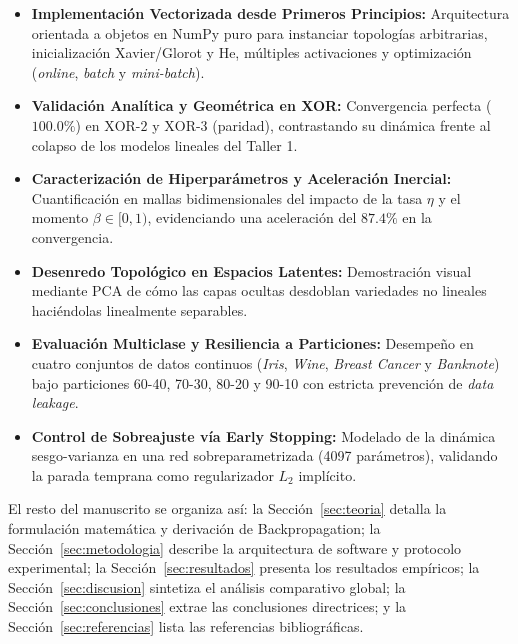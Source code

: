 \documentclass{article}
\begin{document}
\begin{takeawaybox}
\begin{itemize}
    \item \textbf{Implementación Vectorizada desde Primeros Principios:} Arquitectura orientada a objetos en NumPy puro para instanciar topologías arbitrarias, inicialización Xavier/Glorot y He, múltiples activaciones y optimización (\textit{online}, \textit{batch} y \textit{mini-batch}).
    \item \textbf{Validación Analítica y Geométrica en XOR:} Convergencia perfecta ($100.0\%$) en $\text{XOR-2}$ y $\text{XOR-3}$ (paridad), contrastando su dinámica frente al colapso de los modelos lineales del Taller 1.
    \item \textbf{Caracterización de Hiperparámetros y Aceleración Inercial:} Cuantificación en mallas bidimensionales del impacto de la tasa $\eta$ y el momento $\beta \in [0, 1)$, evidenciando una aceleración del $87.4\%$ en la convergencia.
    \item \textbf{Desenredo Topológico en Espacios Latentes:} Demostración visual mediante PCA de cómo las capas ocultas desdoblan variedades no lineales haciéndolas linealmente separables.
    \item \textbf{Evaluación Multiclase y Resiliencia a Particiones:} Desempeño en cuatro conjuntos de datos continuos (\textit{Iris}, \textit{Wine}, \textit{Breast Cancer} y \textit{Banknote}) bajo particiones 60-40, 70-30, 80-20 y 90-10 con estricta prevención de \textit{data leakage}.
    \item \textbf{Control de Sobreajuste vía Early Stopping:} Modelado de la dinámica sesgo-varianza en una red sobreparametrizada (4097 parámetros), validando la parada temprana como regularizador $L_2$ implícito.
\end{itemize}
\end{takeawaybox}

El resto del manuscrito se organiza así: la Sección~\ref{sec:teoria} detalla la formulación matemática y derivación de Backpropagation; la Sección~\ref{sec:metodologia} describe la arquitectura de software y protocolo experimental; la Sección~\ref{sec:resultados} presenta los resultados empíricos; la Sección~\ref{sec:discusion} sintetiza el análisis comparativo global; la Sección~\ref{sec:conclusiones} extrae las conclusiones directrices; y la Sección~\ref{sec:referencias} lista las referencias bibliográficas.

\end{document}
